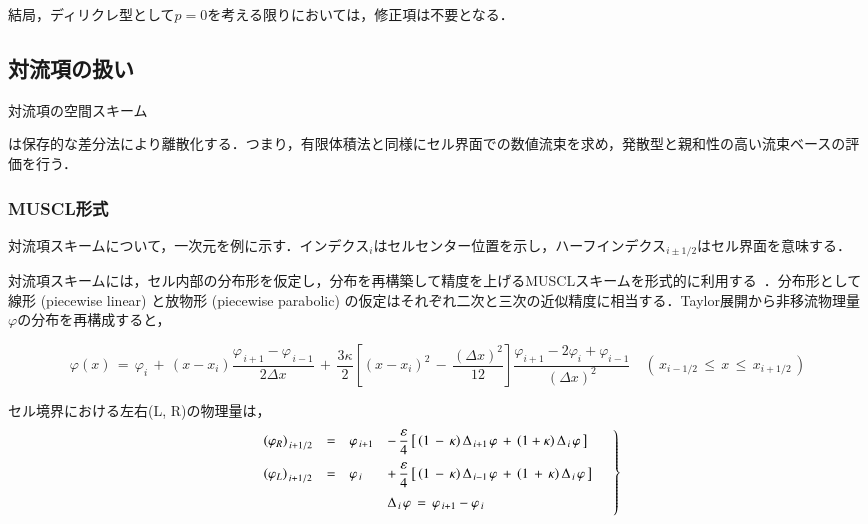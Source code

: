 結局，ディリクレ型として$p=0$を考える限りにおいては，修正項は不要となる．

\subsection{対流項の扱い}
\hypertarget{tgt:convection term}{対流項の空間スキーム}は保存的な差分法により離散化する．つまり，有限体積法と同様にセル界面での数値流束を求め，発散型と親和性の高い流束ベースの評価を行う．

\subsubsection{MUSCL形式}
対流項スキームについて，一次元を例に示す．インデクス${}_i$はセルセンター位置を示し，ハーフインデクス${}_{i\pm1/2}$はセル界面を意味する．

対流項スキームには，セル内部の分布形を仮定し，分布を再構築して精度を上げるMUSCLスキームを形式的に利用する~\cite{fujii:94:CFD}．分布形として線形 (piecewise linear) と放物形 (piecewise parabolic) の仮定はそれぞれ二次と三次の近似精度に相当する．Taylor展開から非移流物理量$\varphi$の分布を再構成すると，

\begin{equation}
\varphi(x) \,=\,
\varphi_i \,+\, 
\left( x-x_i \right) \frac{\varphi_{\,i+1} - \varphi_{\,i-1}}{2\Delta x} \,+\, 
\frac{3\kappa}{2} \left[ {\left( x-x_i \right)}^2
\,-\, \frac{{(\Delta x)}^2}{12} \right] \frac{\varphi_{i+1} - 2\varphi_i + \varphi_{i-1}}{{(\Delta x)}^2}
\quad \left( \, x_{i-1/2} \, \leq \,x\, \leq \, x_{i+1/2} \, \right)
\label{eq:reconstruction}
\end{equation}

\noindent セル境界における左右(L, R)の物理量は，
\begin{equation}
\left.
\begin{array}{llll}
\vspace{2mm}
{\left( \varphi_R \right)}_{\,i+1/2} &=& \varphi_{\,i+1} & \displaystyle{ - \, \frac{\varepsilon}{4} \left[ \, \left( 1 \,-\, \kappa \right) \Delta_{\,i+1\,} \varphi \,+\, \left( 1+\kappa \right) \Delta_{\,i\,} \varphi \,\right] } \\
\vspace{2mm}
{\left( \varphi_L \right)}_{\,i+1/2} &=& \varphi_{\,i} & \displaystyle{ + \, \frac{\varepsilon}{4} \left[ \, \left( 1 \,-\, \kappa \right) \Delta_{\,i-1\,} \varphi \,+\, \left( 1 \,+\, \kappa \right) \Delta_{\,i\,} \varphi \,\right] } \\
\vspace{1mm}
& & & \Delta_{\,i\,} \varphi \,=\, \varphi_{\,i+1} - \varphi_{\,i} \\
\end{array} \quad \right\}
\label{eq:MUSCLE interpolation}
\end{equation}

